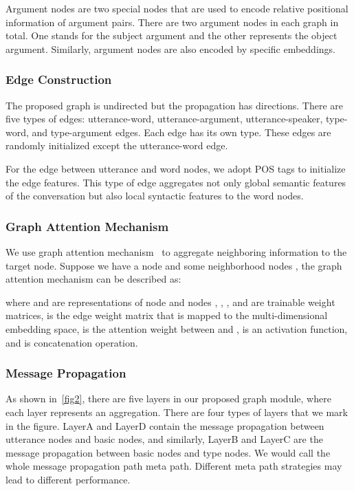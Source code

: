 \documentclass[11pt]{article}
\begin{document}
Argument nodes are two special nodes that are used to encode relative positional information of argument pairs. There are two argument nodes in each graph in total. One stands for the subject argument and the other represents the object argument. Similarly, argument nodes are also encoded by specific embeddings.

\subsubsection{Edge Construction}
The proposed graph is undirected but the propagation has directions. There are five types of edges: utterance-word, utterance-argument, utterance-speaker, type-word, and type-argument edges.  Each edge has its own type. These edges are randomly initialized except the utterance-word edge.

For the edge between utterance and word nodes, we adopt POS tags to initialize the edge features. This type of edge aggregates not only global semantic features of the conversation but also local syntactic features to the word nodes.

\subsubsection{Graph Attention Mechanism}
We use graph attention mechanism~\cite{velivckovic2017graph} to aggregate neighboring information to the target node. Suppose we have a node  and some neighborhood nodes ,  the graph attention mechanism can be described as:


where  and  are representations of node  and nodes , , ,  and  are trainable weight matrices,  is the edge weight matrix that is mapped to the multi-dimensional embedding space,  is the attention weight between  and ,  is an activation function, and  is concatenation operation.

\subsubsection{Message Propagation}
As shown in~\cref{fig2}, there are five layers in our proposed graph module, where each layer represents an aggregation. There are four types of layers that we mark in the figure. LayerA and LayerD contain the message propagation between utterance nodes and basic nodes, and similarly, LayerB and LayerC are the message propagation between basic nodes and type nodes. We would call the whole message propagation path meta path. Different meta path strategies may lead to different performance.
\end{document}
